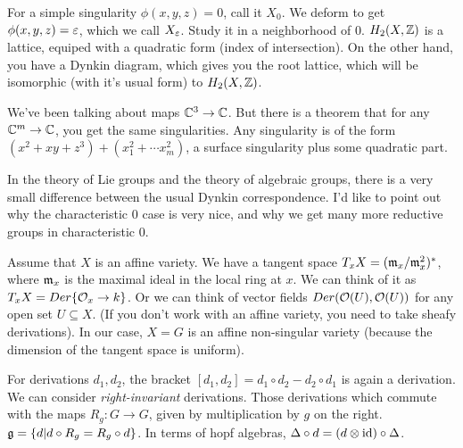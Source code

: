 For a simple singularity $\phi(x,y,z)=0$, call it $X_0$. We deform to get $\phi(x,y,z)=\varepsilon$, which we call $X_\varepsilon$. Study it in a neighborhood of $0$. $H_2(X,\mathbb{Z})$ is a lattice, equiped with a quadratic form (index of intersection). On the other hand, you have a Dynkin diagram, which gives you the root lattice, which will be isomorphic (with it's usual form) to $H_2(X,\mathbb{Z})$.

We've been talking about maps $\mathbb{C}^3\to \mathbb{C}$. But there is a theorem that for any $\mathbb{C}^m\to \mathbb{C}$, you get the same singularities. Any singularity is of the form $(x^2+xy+z^3) + (x_1^2+\cdots x_m^2)$, a surface singularity plus some quadratic part.

In the theory of Lie groups and the theory of algebraic groups, there is a very small difference between the usual Dynkin correspondence. I'd like to point out why the characteristic 0 case is very nice, and why we get many more reductive groups in characteristic 0.


Assume that $X$ is an affine variety. We have a tangent space $T_x X=(\mathfrak{m}_x/\mathfrak{m}_x^2)^*$, where $\mathfrak{m}_x$ is the maximal ideal in the local ring at $x$. We can think of it as $T_xX=Der\{\mathcal{O}_x\to k\}$. Or we can think of vector fields $Der(\mathcal{O}(U),\mathcal{O}(U))$ for any open set $U\subseteq X$. (If you don't work with an affine variety, you need to take sheafy derivations). In our case, $X=G$ is an affine non-singular variety (because the dimension of the tangent space is uniform).

For derivations $d_1,d_2$, the bracket $[d_1,d_2]=d_1\circ d_2-d_2\circ d_1$ is again a derivation. We can consider \emph{right-invariant} derivations. Those derivations which commute with the maps $R_g\colon G\to G$, given by multiplication by $g$ on the right. $\mathfrak{g}=\{d|d\circ R_g=R_g\circ d\}$. In terms of hopf algebras, $\Delta\circ d=(d\otimes \operatorname{id})\circ \Delta$.

